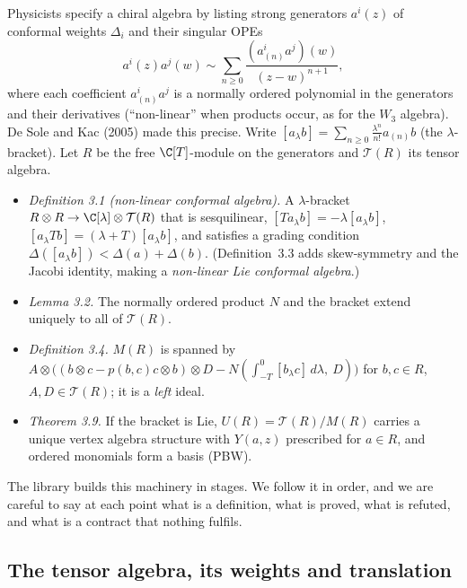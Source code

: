 Physicists specify a chiral algebra by listing strong generators $a^i(z)$ of conformal weights $\Delta_i$ and their
singular OPEs
\begin{equation*}
a^i(z)a^j(w)\sim\sum_{n\ge0}\frac{(a^i_{(n)}a^j)(w)}{(z-w)^{n+1}},
\end{equation*}
where each coefficient $a^i_{(n)}a^j$ is a normally ordered polynomial in the generators and their derivatives
(``non-linear'' when products occur, as for the $W_3$ algebra). De Sole and Kac (2005) made this precise. Write
$[a_\lambda b] = \sum_{n\ge0}\frac{\lambda^n}{n!}a_{(n)}b$ (the $\lambda$-bracket). Let $R$ be the free
$\C[T]$-module on the generators and $\mathcal T(R)$ its tensor algebra.
\begin{itemize}
\item \emph{Definition 3.1 (non-linear conformal algebra).} A $\lambda$-bracket $R\otimes R\to\C[\lambda]\otimes
  \mathcal T(R)$ that is sesquilinear, $[Ta_\lambda b] = -\lambda[a_\lambda b]$, $[a_\lambda Tb] = (\lambda+T)[a_\lambda b]$, and
  satisfies a grading condition $\Delta([a_\lambda b])<\Delta(a)+\Delta(b)$. (Definition~3.3 adds skew-symmetry and the Jacobi
  identity, making a \emph{non-linear Lie conformal algebra}.)
\item \emph{Lemma 3.2.} The normally ordered product $N$ and the bracket extend uniquely to all of $\mathcal T(R)$.
\item \emph{Definition 3.4.} $M(R)$ is spanned by $A\otimes\bigl((b\otimes c - p(b,c)c\otimes b)\otimes D -
  N(\int_{-T}^0[b_\lambda c]\,d\lambda,\ D)\bigr)$ for $b,c\in R$, $A,D\in\mathcal T(R)$; it is a \emph{left} ideal.
\item \emph{Theorem 3.9.} If the bracket is Lie, $U(R) = \mathcal T(R)/M(R)$ carries a unique vertex algebra structure
  with $Y(a,z)$ prescribed for $a\in R$, and ordered monomials form a basis (PBW).
\end{itemize}
The library builds this machinery in stages. We follow it in order, and we are careful to say at each point what is a
definition, what is proved, what is refuted, and what is a contract that nothing fulfils.

\subsection{The tensor algebra, its weights and translation}

